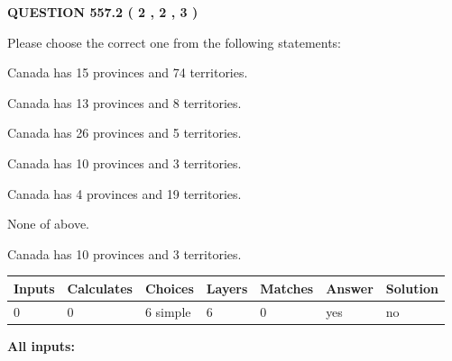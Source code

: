 \documentclass[12pt]{article}
\begin{document}
   
  
\vspace{0.2in}
  
{\textbf{\Large{QUESTION
557.2 
 ( 2 , 2 , 3 )
}}}
  
  
Please choose the correct one from the following statements:
 
 
Canada has  15 provinces and  74 territories.
 
 
Canada has  13 provinces and  8 territories.
 
 
Canada has  26 provinces and  5 territories.
 
 
Canada has 10  provinces and 3 territories.
 
 
Canada has   4 provinces and  19 territories.
 
 
 None of above.
 
 
\noindent{}
 
 
Canada has 10  provinces and 3 territories.
 
 
\noindent{}
 
 
   
   
   
   
\noindent\begin{tabular}{|l|l|l|l|l|l|l|}
 \hline
Inputs & Calculates & Choices & Layers & Matches & Answer & Solution \\ \hline
 0  & 
 0  & 
 6
  simple  
  & 
 6  & 
 0  & 
  yes & 
  no 
  \\ \hline
 \end{tabular}
   
   
   
   
\noindent{}
   
   
   
   
\noindent\vspace{0.1in}\hspace{-0.08in} {\textbf{\Large{All inputs: }}}
   
   
   
   
   
   
 \vspace{0.2in}
 
\end{document}
